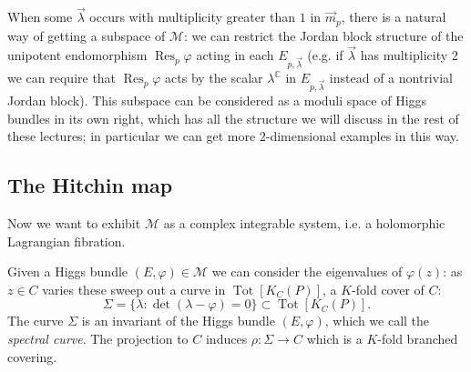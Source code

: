 \documentclass[12pt,letterpaper,reqno]{article}
\numberwithin{equation}{section}
\newcommand{\cM}{\ensuremath{\mathcal M}}
\newcommand{\C}{\ensuremath{\mathbb C}}
\newcommand{\ti}[1]{\textit{#1}}
\DeclareMathOperator{\Res}{Res}
\DeclareMathOperator{\Tot}{Tot}
\begin{document}
\begin{remark}
When some $\vec\lambda$ occurs with multiplicity
greater than $1$ in $\vec{m}_p$, there 
is a natural way of getting a subspace of $\cM$:
we can restrict the Jordan block structure of
the unipotent endomorphism $\Res_p \varphi$
acting in each $E_{p,\vec\lambda}$ (e.g. if $\vec\lambda$ has
multiplicity $2$ we can require that $\Res_p \varphi$ acts
by the scalar $\lambda^\C$ in $E_{p,\vec\lambda}$ instead of
a nontrivial Jordan block). This subspace can be considered
as a moduli space of Higgs bundles in its own right, which
has all the structure we will discuss
in the rest of these lectures; 
in particular we can get
more $2$-dimensional examples in this way.
\end{remark}



\subsection{The Hitchin map}

Now we want to exhibit $\cM$ as a complex integrable system,
i.e. a holomorphic Lagrangian fibration.

Given a Higgs bundle $(E,\varphi) \in \cM$ we can consider
the eigenvalues of $\varphi(z)$: as $z \in C$ varies
these sweep out a curve in $\Tot[K_C(P)]$, a $K$-fold cover of $C$:
\begin{equation}
  \Sigma = \{ \lambda: \det(\lambda - \varphi) = 0\} \subset \Tot[K_C(P)].
\end{equation}
The curve $\Sigma$ is an invariant of the Higgs 
bundle $(E,\varphi)$, which we call
the \ti{spectral curve}. 
The projection to $C$ induces $\rho: \Sigma \to C$ which is a $K$-fold branched covering.
\end{document}
